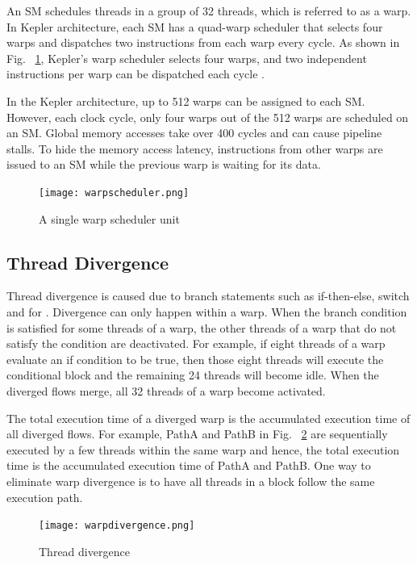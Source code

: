 An SM schedules threads in a group of 32 threads, which is referred to as a warp. In Kepler architecture, each SM has a quad-warp scheduler that selects four warps and dispatches two instructions from each warp every cycle.  As shown in Fig. ~\ref{fig:warpscheduler}, Kepler’s warp scheduler selects four warps, and two independent instructions per warp can be dispatched each cycle \cite{bib30}. 

In the Kepler architecture, up to 512 warps can be assigned to each SM. However, each clock cycle, only four warps out of the 512 warps are scheduled on an SM. Global memory accesses take over 400 cycles and can cause pipeline stalls. To hide the memory access latency, instructions from other warps are issued to an SM while the previous warp is waiting for its data.

\begin{figure}[H]
	\centering
	\texttt{[image: warpscheduler.png]}
	\caption{A single warp scheduler unit}
	\label{fig:warpscheduler}
\end{figure}
\squeezeup

\subsection{Thread Divergence}
Thread divergence is caused due to branch statements such as if-then-else, switch and for \cite{bib5}. Divergence can only happen within a warp. When the branch condition is satisfied for some threads of a warp, the other threads of a warp that do not satisfy the condition are deactivated. For example, if eight threads of a warp evaluate an if condition to be true, then those eight threads will execute the conditional block and the remaining 24 threads will become idle. When the diverged flows merge, all 32 threads of a warp become activated.

The total execution time of a diverged warp is the accumulated execution time of all diverged flows. For example, PathA and PathB in Fig. ~\ref{fig:warpdivergence} are sequentially executed by a few threads within the same warp and hence, the total execution time is the accumulated execution time of PathA and PathB. One way to eliminate warp divergence is to have all threads in a block follow the same execution path. 

\begin{figure}[H]
	\centering
	\texttt{[image: warpdivergence.png]}
	\caption{Thread divergence}
	\label{fig:warpdivergence}
\end{figure}
\squeezeup

